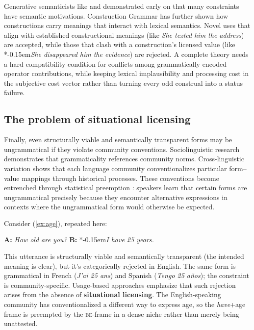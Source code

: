\documentclass[12pt,letterpaper]{article}
\newcommand{\mention}[1]{\textit{#1}}
\newcommand{\olang}[1]{\textit{#1}}
\newcommand{\judgesep}{\kern-0.15em}
\newcommand{\ungram}[1]{*\judgesep#1}
\begin{document}
Generative semanticists like \textcite{lakoff1971} and \textcite{mccawley1968} demonstrated early on that many constraints have semantic motivations. Construction Grammar \autocite{goldberg1995constructions} has further shown how constructions carry meanings that interact with lexical semantics. Novel uses that align with established constructional meanings (like \mention{She texted him the address}) are accepted, while those that clash with a construction's licensed value (like \ungram{\mention{She disappeared him the evidence}}) are rejected. A complete theory needs a hard compatibility condition for conflicts among grammatically encoded operator contributions, while keeping lexical implausibility and processing cost in the subjective cost vector rather than turning every odd construal into a status failure.

\subsection{The problem of situational licensing}\label{sec:impasse-licensing}

Finally, even structurally viable and semantically transparent forms may be ungrammatical if they violate community conventions. Sociolinguistic research \autocite{labov1972} demonstrates that grammaticality references community norms. Cross-linguistic variation shows that each language community conventionalizes particular form--value mappings through historical processes. These conventions become entrenched through statistical preemption \autocite{Goldberg2011}: speakers learn that certain forms are ungrammatical precisely because they encounter alternative expressions in contexts where the ungrammatical form would otherwise be expected.

Consider (\ref{ex:age}), repeated here:

\ea
\textbf{A:} \mention{How old are you?} \textbf{B:} \ungram{\mention{I have 25 years.}}
\z

This utterance is structurally viable and semantically transparent (the intended meaning is clear), but it's categorically rejected in English. The same form is grammatical in French (\olang{J'ai 25 ans}) and Spanish (\olang{Tengo 25 años}); the constraint is community-specific. Usage-based approaches \autocite{bybee2006} emphasize that such rejection arises from the absence of \textbf{situational licensing}. The English-speaking community has conventionalized a different way to express age, so the \mention{have}+age frame is preempted by the \textsc{be}-frame in a dense niche rather than merely being unattested.
\end{document}
